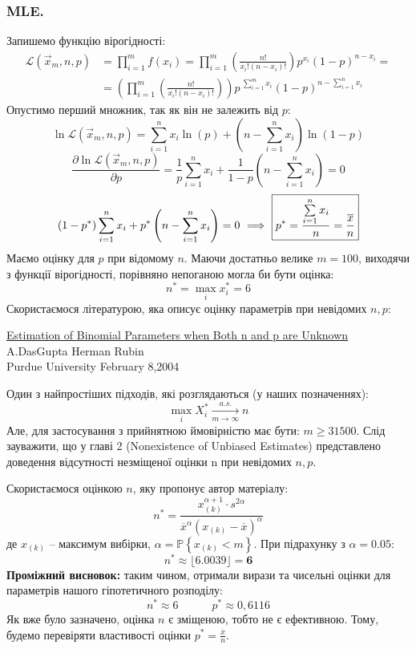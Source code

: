 \documentclass[14pt,a4paper]{scrartcl}
\theoremstyle{definition}
\theoremstyle{remark}
\theoremstyle{definition}
\theoremstyle{definition}
\def\i{\infty}                 %
\def\d{\partial}               %
\begin{document}
\subsubsection*{MLE.}
Запишемо функцію вірогідності:
\[
\begin{split}
   \mathcal{L}(\overrightarrow{x}_m, n, p) &=  \prod\limits_{i=1}^{m}{f(x_i)} = \prod\limits_{i=1}^{m}{\left(\frac{n!}{{x}_{i}!\left(n-{x}_{i} \right)!} \right){p}^{{x}_{i}}{\left(1-p \right)}^{n-{x}_{i}} } =  \\
   &= \left( \prod_{i=1}^{m}\left(\frac{n!}{{x}_{i}!\left(n-{x}_{i} \right)!} \right)\right){p}^{\ \sum\limits_{i=1}^{m}{x}_{i}}{\left(1-p \right)}^{n-\sum\limits_{i=1}^{n}{x}_{i}}
\end{split}
\]
Опустимо перший множник, так як він не залежить від \( p \):
\[
  \ln \mathcal{L}(\overrightarrow{x}_m, n, p)=\sum_{i=1}^{n}{x}_{i} \ln(p)+\left(n-\sum_{i=1}^{n}{x}_{i} \right)\ln\left(1-p \right)
\]
\[
  \frac{\d\ln\mathcal{L}(\overrightarrow{x}_m, n, p)}{\d p}=\frac{1}{p}\sum_{i=1}^{n}{x}_{i}+\frac{1}{1-p}\left(n-\sum_{i=1}^{n}{x}_{i} \right)=0
\]
\[
 \left(1-p^*\right)\sum_{i=1}^{n}{x}_{i}+p^*\left(n-\sum_{i=1}^{n}{x}_{i} \right)=0 \ \Longrightarrow\    \fbox{\( \displaystyle
    p^*=\frac{\sum\limits_{i=1}^{n}{x}_{i}}{n}=\frac{\overline{x}}{n}
  \)}
\]
Маємо оцінку для $p$ при відомому $n$. Маючи достатньо велике $m=100$, виходячи з функції вірогідності, порівняно непоганою могла би бути оцінка:
\[
 n^* =  \max\limits_{i}{x^*_i} = 6
\]
Скористаємося літературою, яка описує оцінку параметрів при невідомих $n,p$:
\begin{center}
\href{https://www.stat.purdue.edu/~dasgupta/publications/binomialn.pdf}{Estimation of Binomial Parameters when Both n and p are Unknown}
\
 \\ A.DasGupta   Herman Rubin
 \\
 Purdue University \quad February 8,2004
\end{center}
Один з найпростіших підходів, які розглядаються (у наших позначеннях):
\[
  \max\limits_{i}{X^*_i} \xrightarrow[m\to\i]{a.s.} n
\]
Але, для застосування з прийнятною ймовірністю має бути: $m \geq 31500$. Слід зауважити, що у главі 2 (Nonexistence of Unbiased Estimates) представлено доведення відсутності незміщеної оцінки n при невідомих \( n,p \).\par
Скористаємося оцінкою $n$, яку пропонує автор матеріалу:
\[
  n^* = \frac{x^{\alpha +1}_{(k)} \cdot s^{2 \alpha}}{ \overline{x}^{\alpha} ( x_{(k)} -  \overline{x})^{\alpha}}
\]
де \(  x_{(k)} \) -- максимум вибірки, \( \alpha = \mathbb{P} \left\lbrace x_{(k)} < m \right\rbrace \). При підрахунку з $\alpha = 0.05$:
\[
 n^* \approx \lfloor  6.0039 \rfloor  = \mathbf{6}
\]
\textbf{Проміжний висновок:} таким чином, отримали вирази та чисельні оцінки для параметрів нашого гіпотетичного розподілу:
 \[
  n^* \approx 6 \qquad \quad p^* \approx 0,6116
 \]
 Як вже було зазначено, оцінка \( n \) є зміщеною, тобто не є ефективною. Тому, будемо перевіряти властивості оцінки \( p^* = \frac{\overline{x}}{n} \).
 \newpage
\end{document}
